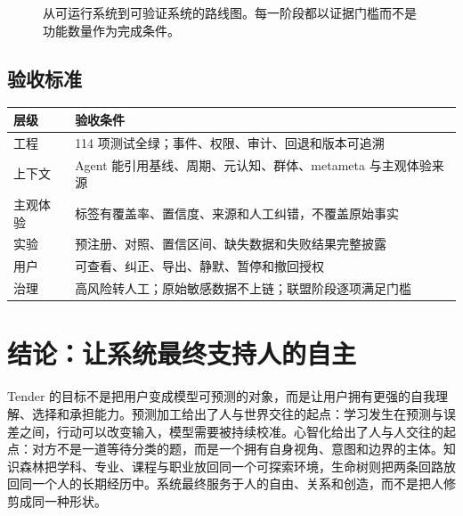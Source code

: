 \documentclass[UTF8,a4paper,11pt]{ctexart}
\begin{document}
\begin{figure}[htbp]
\centering
{}
\caption{从可运行系统到可验证系统的路线图。每一阶段都以证据门槛而不是功能数量作为完成条件。}
\end{figure}

\subsection{验收标准}

\begin{center}
\begin{longtable}{@{}p{4.3cm}p{8.5cm}@{}}
\toprule
\textbf{层级} & \textbf{验收条件} \\
\midrule
工程 & 114 项测试全绿；事件、权限、审计、回退和版本可追溯 \\
上下文 & Agent 能引用基线、周期、元认知、群体、metameta 与主观体验来源 \\
主观体验 & 标签有覆盖率、置信度、来源和人工纠错，不覆盖原始事实 \\
实验 & 预注册、对照、置信区间、缺失数据和失败结果完整披露 \\
用户 & 可查看、纠正、导出、静默、暂停和撤回授权 \\
治理 & 高风险转人工；原始敏感数据不上链；联盟阶段逐项满足门槛 \\
\bottomrule
\end{longtable}
\end{center}

\newpage
\section{结论：让系统最终支持人的自主}

Tender 的目标不是把用户变成模型可预测的对象，而是让用户拥有更强的自我理解、选择和承担能力。预测加工给出了人与世界交往的起点：学习发生在预测与误差之间，行动可以改变输入，模型需要被持续校准。心智化给出了人与人交往的起点：对方不是一道等待分类的题，而是一个拥有自身视角、意图和边界的主体。知识森林把学科、专业、课程与职业放回同一个可探索环境，生命树则把两条回路放回同一个人的长期经历中。系统最终服务于人的自由、关系和创造，而不是把人修剪成同一种形状。
\end{document}
